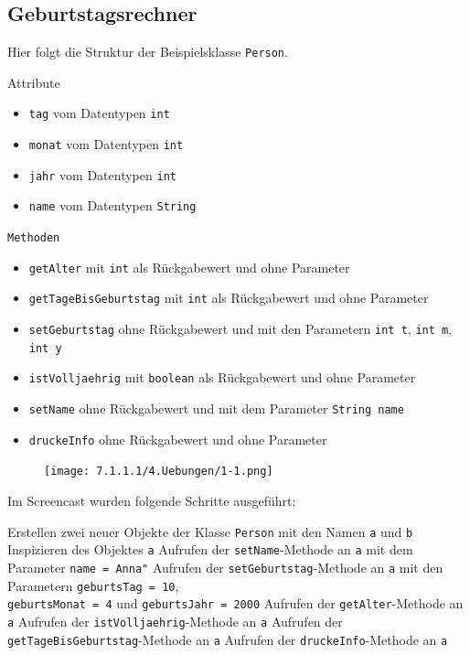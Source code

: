 \documentclass{scrartcl}   %
\begin{document}
\subsection{Geburtstagsrechner}

Hier folgt die Struktur der Beispielsklasse \texttt{Person}.

\begin{itemize}
    \barrow Attribute
    \begin{itemize}
    \item \texttt{tag} vom Datentypen \texttt{int}
    \item \texttt{monat} vom Datentypen \texttt{int}
    \item \texttt{jahr} vom Datentypen \texttt{int}
    \item \texttt{name} vom Datentypen \texttt{String}
    \end{itemize}
    \barrow \texttt{Methoden}
    \begin{itemize}
    \item \texttt{getAlter} mit \texttt{int} als Rückgabewert und ohne Parameter
    \item \texttt{getTageBisGeburtstag} mit \texttt{int} als Rückgabewert und ohne Parameter
    \item \texttt{setGeburtstag} ohne Rückgabewert und mit den Parametern \texttt{int t}, \texttt{int m}, \texttt{int y}
    \item \texttt{istVolljaehrig} mit \texttt{boolean} als Rückgabewert und ohne Parameter
    \item \texttt{setName} ohne Rückgabewert und mit dem Parameter \texttt{String name}
    \item \texttt{druckeInfo} ohne Rückgabewert und ohne Parameter
    \end{itemize}
\end{itemize}

\vspace{0.5cm}

\begin{figure}[ht]
	\centering
	\texttt{[image: 7.1.1.1/4.Uebungen/1-1.png]}
\end{figure}

\newpage

Im Screencast wurden folgende Schritte ausgeführt:

\begin{itemize}
    \barrow Erstellen zwei neuer Objekte der Klasse \texttt{Person} mit den Namen \texttt{a} und \texttt{b}
    \barrow Inspizieren des Objektes \texttt{a}
    \barrow Aufrufen der \texttt{setName}-Methode an \texttt{a} mit dem Parameter \texttt{name = \dq Anna"}
    \barrow Aufrufen der \texttt{setGeburtstag}-Methode an \texttt{a} mit den Parametern \texttt{geburtsTag = 10},\\ \texttt{geburtsMonat = 4} und \texttt{geburtsJahr = 2000}
    \barrow Aufrufen der \texttt{getAlter}-Methode an \texttt{a}
    \barrow Aufrufen der \texttt{istVolljaehrig}-Methode an \texttt{a}
    \barrow Aufrufen der \texttt{getTageBisGeburtstag}-Methode an \texttt{a}
    \barrow Aufrufen der \texttt{druckeInfo}-Methode an \texttt{a}
\end{itemize}
\end{document}

